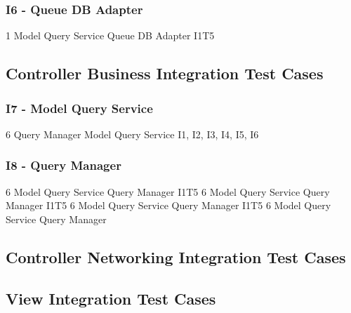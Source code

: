\subsubsection{I6 - Queue DB Adapter}
\testCaseSimpleSimple
	{1}
	{Model Query Service}
	{Queue DB Adapter}
	{I1T5}
\subsection{Controller Business Integration Test Cases}
\subsubsection{I7 - Model Query Service}
\testCaseSimple
{6}
{Query Manager}
{Model Query Service}
{I1, I2, I3, I4, I5, I6}
{}
\subsubsection{I8 - Query Manager}
\testCaseSimple
{6}
{Model Query Service}
{Query Manager}
{I1T5}
{}
\testCaseSimple
{6}
{Model Query Service}
{Query Manager}
{I1T5}
{}
\testCaseSimple
{6}
{Model Query Service}
{Query Manager}
{I1T5}
{}
\testCaseSimple
{6}
{Model Query Service}
{Query Manager}
{}
\subsection{Controller Networking Integration Test Cases}
\subsection{View Integration Test Cases}